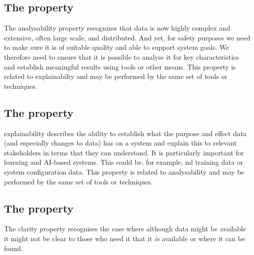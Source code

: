 \subsection{The  property}\label{bkm:guidance:analysability}
The \gls{analysability} property recognizes that data is now highly complex and extensive, often large scale, and distributed. And yet, for safety purposes we need to make sure it is of suitable quality and able to support system goals.
We therefore need to ensure that it is possible to analyse it for key characteristics and establish meaningful results using tools or other means. This property is related to explainabilty and may be performed by the same set of tools or techniques.

\subsection{The  property}\label{bkm:guidance:explainability}
\Gls{explainability} describes the ability to establish what the purpose and effect data (and especially changes to data) has on a system
and explain this to relevant \glspl{stakeholder} in terms that they can understand. It is particularly important for learning and AI-based systems.
This could be, for example, \gls{ml} training data or system \gls{configuration data}.
This property is related to \gls{analysability} and may be performed by the same set of tools or techniques.

\subsection{The  property}
The clarity property recognises the case where although data might be available it might not be clear to those who need it that it \textit{is} available or where it can be found.
%

